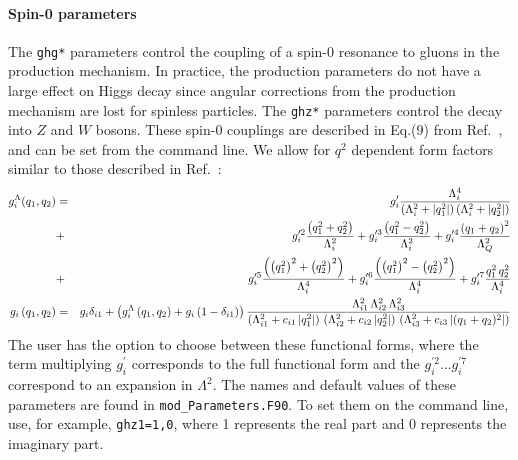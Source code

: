 \documentclass[aps,superscriptaddress,nofootinbib]{revtex4}
\begin{document}
\paragraph{Spin-0 parameters}
\label{spin0}
The \verb|ghg*| parameters control the coupling of a spin-0 resonance to gluons in the production mechanism.
In practice, the production parameters do not have a large effect on Higgs decay since angular corrections from the production mechanism are lost for spinless particles.
The \verb|ghz*| parameters control the decay into $Z$ and $W$ bosons.
These spin-0 couplings are described in Eq.(9) from Ref.~\cite{Bolognesi:2012}, and can be set from the command line.
We allow for $q^2$ dependent form factors similar to those described in Ref.~\cite{Anderson:2013}:
\begin{eqnarray*}
	g^\Lambda_i(q_1,q_2) &=&
	g_i' \frac{\Lambda_i^4}{\left(\Lambda_i^2 + |q_1^2|\right)\left(\Lambda_i^2 + |q_2^2|\right)} \\
	&+& g_i^{\prime 2}  \frac{\left(q_1^2+q_2^2\right)}{\Lambda_i^2}
	+ g_i^{\prime 3}  \frac{\left(q_1^2-q_2^2\right)}{\Lambda_i^2}
	+ g_i^{\prime 4}  \frac{\left(q_1+q_2\right)^2}{\Lambda_Q^2} \\
	&+& g_i^{\prime 5}  \frac{\left(\left(q_1^2\right)^2+\left(q_2^2\right)^2\right)}{\Lambda_i^4}
	+ g_i^{\prime 6}  \frac{\left(\left(q_1^2\right)^2-\left(q_2^2\right)^2\right)}{\Lambda_i^4}
	+ g_i^{\prime 7}  \frac{q_1^2 \, q_2^2}{\Lambda_i^4} \\
	g_i\left(q_1,q_2\right) &=& g_i \delta_{i1} + \left(g^\Lambda_i \left(q_1,q_2\right) + g_i \left(1- \delta_{i1}\right)\right)
	\frac{\Lambda^2_{i1}\,\Lambda^2_{i2}\,\Lambda^2_{i3}}
	{\left(\Lambda^2_{i1}+c_{i1}\left|q_1^2\right|\right)\,\left(\Lambda^2_{i2}+c_{i2}\left|q_2^2\right|\right)\,\left(\Lambda^2_{i3}+c_{i3}\left|(q_1+q_2)^2\right|\right)}
	\noindent
\end{eqnarray*}
The user has the option to choose between these functional forms,
where the term multiplying $g_i^\prime$ corresponds to the full functional form and the $g_i^{\prime 2}... g_i^{\prime 7}$ correspond to an expansion in $\Lambda^2$.
The names and default values of these parameters are found in \verb|mod_Parameters.F90|.  To set them on the command line, use, for example, \verb|ghz1=1,0|, where 1 represents the real part and 0 represents the imaginary part.
\end{document}
